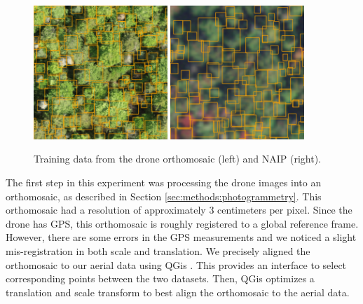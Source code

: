 \begin{figure}
    \centering
    \includegraphics[width=0.45\textwidth]{figs/methods/tree_detection/annotations/stow_anew_2023_06_15_collect_000_manual_000_ortho_mesh_georef_train_annotations_2.png}
    \includegraphics[width=0.45\textwidth]{figs/methods/tree_detection/annotations/naip_crop_m_4407237_nw_18_060_20210920_train_annotations_5.png}
    \caption{Training data from the drone orthomosaic (left) and NAIP (right).}
    \label{fig:methods:tree_det_data}
\end{figure}


The first step in this experiment was processing the drone images into an orthomosaic, as described in Section \ref{sec:methods:photogrammetry}. This orthomosaic had a resolution of approximately 3 centimeters per pixel. Since the drone has GPS, this orthomosaic is roughly registered to a global reference frame. However, there are some errors in the GPS measurements and we noticed a slight mis-registration in both scale and translation. We precisely aligned the orthomosaic to our aerial data using QGis \cite{QGIS_software}. This provides an interface to select corresponding points between the two datasets. Then, QGis optimizes a translation and scale transform to best align the orthomosaic to the aerial data. 

